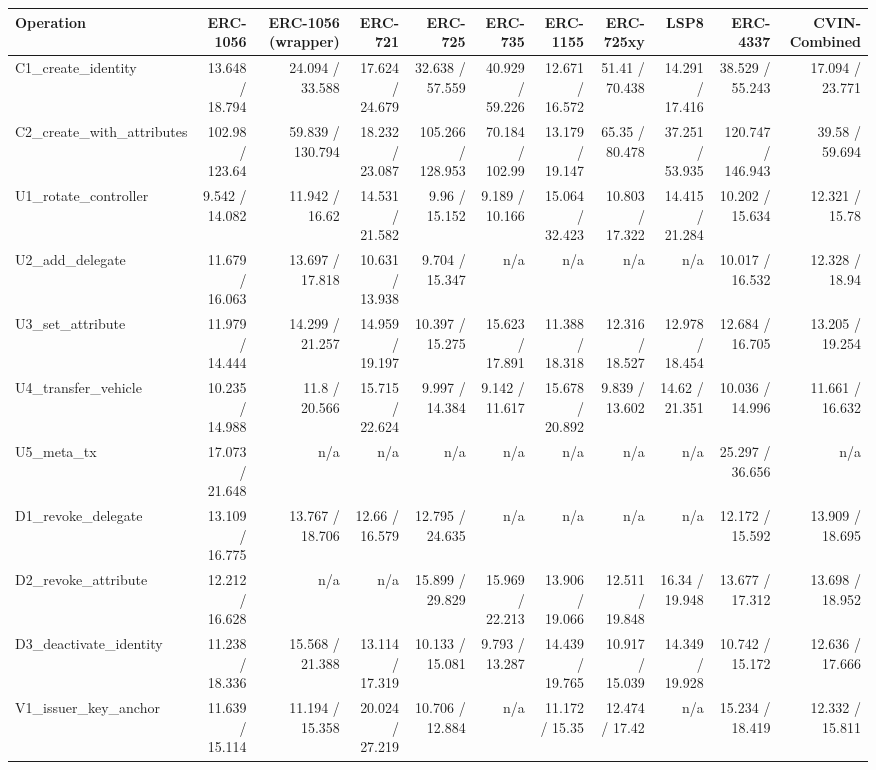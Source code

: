 \begin{table}[ht]
\centering
\small
\begin{tabular}{lrrrrrrrrrr}
\toprule
Operation & ERC-1056 & ERC-1056 (wrapper) & ERC-721 & ERC-725 & ERC-735 & ERC-1155 & ERC-725xy & LSP8 & ERC-4337 & CVIN-Combined \\
\midrule
C1\_create\_identity & 13.648 / 18.794 & 24.094 / 33.588 & 17.624 / 24.679 & 32.638 / 57.559 & 40.929 / 59.226 & 12.671 / 16.572 & 51.41 / 70.438 & 14.291 / 17.416 & 38.529 / 55.243 & 17.094 / 23.771 \\
C2\_create\_with\_attributes & 102.98 / 123.64 & 59.839 / 130.794 & 18.232 / 23.087 & 105.266 / 128.953 & 70.184 / 102.99 & 13.179 / 19.147 & 65.35 / 80.478 & 37.251 / 53.935 & 120.747 / 146.943 & 39.58 / 59.694 \\
U1\_rotate\_controller & 9.542 / 14.082 & 11.942 / 16.62 & 14.531 / 21.582 & 9.96 / 15.152 & 9.189 / 10.166 & 15.064 / 32.423 & 10.803 / 17.322 & 14.415 / 21.284 & 10.202 / 15.634 & 12.321 / 15.78 \\
U2\_add\_delegate & 11.679 / 16.063 & 13.697 / 17.818 & 10.631 / 13.938 & 9.704 / 15.347 & n/a & n/a & n/a & n/a & 10.017 / 16.532 & 12.328 / 18.94 \\
U3\_set\_attribute & 11.979 / 14.444 & 14.299 / 21.257 & 14.959 / 19.197 & 10.397 / 15.275 & 15.623 / 17.891 & 11.388 / 18.318 & 12.316 / 18.527 & 12.978 / 18.454 & 12.684 / 16.705 & 13.205 / 19.254 \\
U4\_transfer\_vehicle & 10.235 / 14.988 & 11.8 / 20.566 & 15.715 / 22.624 & 9.997 / 14.384 & 9.142 / 11.617 & 15.678 / 20.892 & 9.839 / 13.602 & 14.62 / 21.351 & 10.036 / 14.996 & 11.661 / 16.632 \\
U5\_meta\_tx & 17.073 / 21.648 & n/a & n/a & n/a & n/a & n/a & n/a & n/a & 25.297 / 36.656 & n/a \\
D1\_revoke\_delegate & 13.109 / 16.775 & 13.767 / 18.706 & 12.66 / 16.579 & 12.795 / 24.635 & n/a & n/a & n/a & n/a & 12.172 / 15.592 & 13.909 / 18.695 \\
D2\_revoke\_attribute & 12.212 / 16.628 & n/a & n/a & 15.899 / 29.829 & 15.969 / 22.213 & 13.906 / 19.066 & 12.511 / 19.848 & 16.34 / 19.948 & 13.677 / 17.312 & 13.698 / 18.952 \\
D3\_deactivate\_identity & 11.238 / 18.336 & 15.568 / 21.388 & 13.114 / 17.319 & 10.133 / 15.081 & 9.793 / 13.287 & 14.439 / 19.765 & 10.917 / 15.039 & 14.349 / 19.928 & 10.742 / 15.172 & 12.636 / 17.666 \\
V1\_issuer\_key\_anchor & 11.639 / 15.114 & 11.194 / 15.358 & 20.024 / 27.219 & 10.706 / 12.884 & n/a & 11.172 / 15.35 & 12.474 / 17.42 & n/a & 15.234 / 18.419 & 12.332 / 15.811 \\

\end{tabular}
\end{table}
